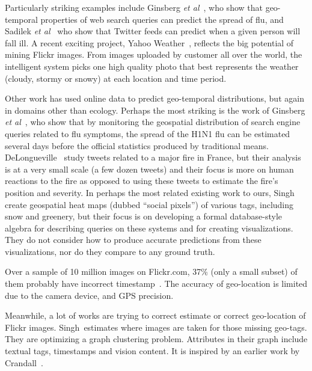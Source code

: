 
Particularly striking examples include Ginsberg
\textit{et al}~\cite{ginsberg09flu}, who show that 
geo-temporal properties of web search queries can
predict the spread of flu, and Sadilek \textit{et al}~\cite{Sadilek:2012wp} who show that
Twitter feeds can predict when a given person will
fall ill. A recent exciting project, Yahoo Weather~\cite{yahooweather}, reflects the big potential
of mining Flickr images. From images uploaded by customer all over the world, the intelligent system
picks one high quality
photo that best represents the weather (cloudy, stormy or snowy) at each location and time period.


Other work has used online data to predict geo-temporal distributions,
but again in domains other than ecology.  Perhaps the most
striking is the work of Ginsberg \textit{et al}~\cite{ginsberg09flu},
who show that by monitoring the geospatial distribution of search
engine queries related to flu symptoms, the spread of the H1N1
flu can be estimated several days before the official statistics produced by traditional
means.
DeLongueville\etal~\cite{delongueville09} study tweets related to a major fire in
France, but their analysis is at a very small scale (a few dozen
tweets) and their focus is more on human reactions to the fire as
opposed to using these tweets to estimate the fire's position and
severity.  In perhaps the most related existing work to ours,
Singh\etal~\cite{singh10socialpixels} create
geospatial heat maps (dubbed ``social pixels'') of various
tags, including snow and greenery, but their focus is on developing a
formal database-style algebra for describing queries on these systems
and for creating visualizations. They do not consider how to produce
accurate predictions from these visualizations, nor do they compare to
any ground truth.

Over a sample of 10 million images on Flickr.com, 37\% (only a small subset) of them probably have incorrect timestamp~\cite{thomee2014s}.
The accuracy of geo-location is limited due to the camera device, and GPS precision.

Meanwhile, a lot of works are trying to correct estimate or correct geo-location of Flickr images.
Singh\etal~\cite{singh2010geo}estimates where images are taken for those missing geo-tags. They are optimizing a graph clustering problem. Attributes in their graph include textual tags, timestamps and vision content. It is inspired by an earlier work by Crandall\etal~\cite{crandall2009mapping}.

